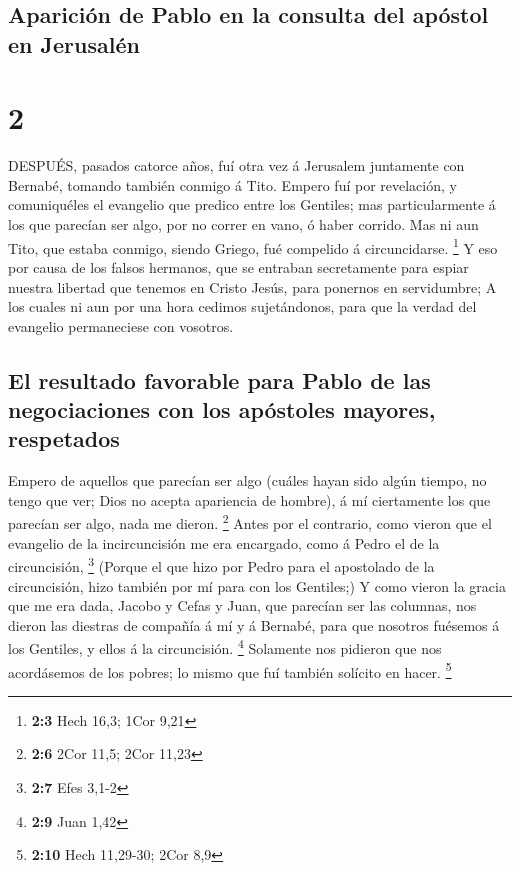 \hypertarget{apariciuxf3n-de-pablo-en-la-consulta-del-apuxf3stol-en-jerusaluxe9n}{%
\subsection{Aparición de Pablo en la consulta del apóstol en
Jerusalén}\label{apariciuxf3n-de-pablo-en-la-consulta-del-apuxf3stol-en-jerusaluxe9n}}

\hypertarget{section-1}{%
\section{2}\label{section-1}}

 DESPUÉS, pasados catorce años, fuí otra vez á Jerusalem
juntamente con Bernabé, tomando también conmigo á Tito. 
Empero fuí por revelación, y comuniquéles el evangelio que predico entre
los Gentiles; mas particularmente á los que parecían ser algo, por no
correr en vano, ó haber corrido.  Mas ni aun Tito, que
estaba conmigo, siendo Griego, fué compelido á circuncidarse.
\footnote{\textbf{2:3} Hech 16,3; 1Cor 9,21}  Y eso por
causa de los falsos hermanos, que se entraban secretamente para espiar
nuestra libertad que tenemos en Cristo Jesús, para ponernos en
servidumbre;  A los cuales ni aun por una hora cedimos
sujetándonos, para que la verdad del evangelio permaneciese con
vosotros.

\hypertarget{el-resultado-favorable-para-pablo-de-las-negociaciones-con-los-apuxf3stoles-mayores-respetados}{%
\subsection{El resultado favorable para Pablo de las negociaciones con
los apóstoles mayores,
respetados}\label{el-resultado-favorable-para-pablo-de-las-negociaciones-con-los-apuxf3stoles-mayores-respetados}}

 Empero de aquellos que parecían ser algo (cuáles hayan sido
algún tiempo, no tengo que ver; Dios no acepta apariencia de hombre), á
mí ciertamente los que parecían ser algo, nada me dieron. \footnote{\textbf{2:6}
  2Cor 11,5; 2Cor 11,23}  Antes por el contrario, como
vieron que el evangelio de la incircuncisión me era encargado, como á
Pedro el de la circuncisión, \footnote{\textbf{2:7} Efes 3,1-2}
 (Porque el que hizo por Pedro para el apostolado de la
circuncisión, hizo también por mí para con los Gentiles;)  Y
como vieron la gracia que me era dada, Jacobo y Cefas y Juan, que
parecían ser las columnas, nos dieron las diestras de compañía á mí y á
Bernabé, para que nosotros fuésemos á los Gentiles, y ellos á la
circuncisión. \footnote{\textbf{2:9} Juan 1,42}  Solamente
nos pidieron que nos acordásemos de los pobres; lo mismo que fuí también
solícito en hacer. \footnote{\textbf{2:10} Hech 11,29-30; 2Cor 8,9}

